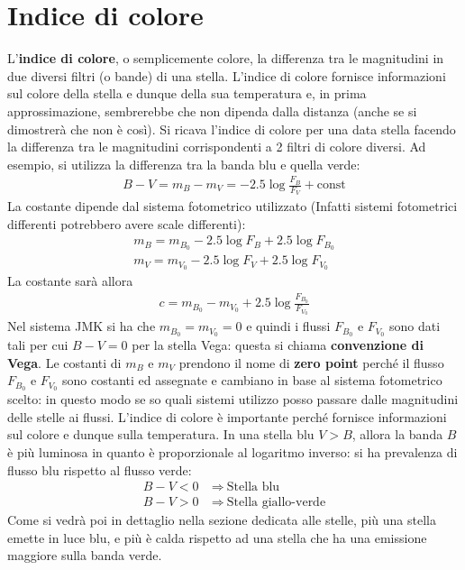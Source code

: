 \documentclass[a4paper, oneside]{book}
\begin{document}
\section{Indice di colore}
L'\textbf{indice di colore}, o semplicemente colore, la differenza tra le magnitudini in due diversi filtri (o bande) di una stella.
L'indice di colore fornisce informazioni sul colore della stella e dunque della sua
temperatura e, in prima approssimazione, sembrerebbe che non dipenda dalla distanza (anche se si dimostrerà che
non è così). Si ricava l'indice di 
colore per una data stella facendo la differenza tra le magnitudini 
corrispondenti a 2 filtri di colore diversi. Ad esempio, si utilizza la
differenza tra la banda blu e quella verde:
\begin{gather*}
    B - V = m_B - m_V = -2.5 \log \frac{F_B}{F_V} + \text{const}
\end{gather*}
La costante dipende dal sistema fotometrico utilizzato (Infatti sistemi fotometrici 
differenti potrebbero avere scale differenti):
\begin{gather*}
    m_B = m_{B_0} - 2.5 \log F_B + 2.5 \log F_{B_0} \\
    m_V = m_{V_0} - 2.5 \log F_V + 2.5 \log F_{V_0}
\end{gather*}
La costante sarà allora
\begin{gather*}
    c = m_{B_0} - m_{V_0} + 2.5 \log \frac{F_{B_0}}{F_{V_0}}
\end{gather*}
Nel sistema JMK si ha che $m_{B_0} = m_{V_0} = 0$ e quindi i flussi 
$F_{B_0}$ e $F_{V_0}$ sono dati tali per cui $B  - V = 0$ per
la stella Vega: questa si chiama \textbf{convenzione di Vega}. Le costanti di $m_B$ e
$m_V$ prendono il nome di \textbf{zero point} perché il flusso $F_{B_0}$ e $F_{V_0}$ sono 
costanti ed assegnate e cambiano in base al sistema fotometrico
scelto: in questo modo se so quali sistemi utilizzo posso passare
dalle magnitudini delle stelle ai flussi.  
L'indice di colore è importante perché fornisce informazioni sul colore e dunque sulla temperatura.
In una stella blu $V > B$, allora la banda $B$ è più luminosa in quanto è proporzionale
al logaritmo inverso: si ha prevalenza di flusso blu rispetto al flusso verde:
\begin{align*}
    B - V < 0 \ &\Longrightarrow \ \text{Stella blu} \\
    B - V > 0 \ &\Longrightarrow \ \text{Stella giallo-verde}
\end{align*}
Come si vedrà poi in dettaglio nella sezione dedicata alle stelle, più una stella emette 
in luce blu, e più è calda rispetto ad una stella che ha una emissione maggiore sulla banda verde.
\end{document}
